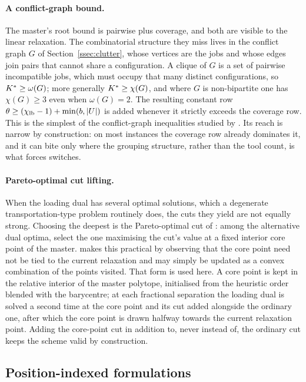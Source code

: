 \paragraph{A conflict-graph bound.}
The master's root bound is pairwise plus coverage, and both are visible to the linear
relaxation. The combinatorial structure they miss lives in the conflict graph $G$ of
Section~\ref{ssec:clutter}, whose vertices are the jobs and whose edges join pairs
that cannot share a configuration. A clique of $G$ is a set of pairwise incompatible
jobs, which must occupy that many distinct configurations, so $K^{\ast}\ge\omega(G)$; more
generally $K^{\ast}\ge\chi(G)$, and where $G$ is non-bipartite one has $\chi(G)\ge3$ even
when $\omega(G)=2$. The resulting constant row
$\theta\ge(\chi_{\mathrm{lb}}-1)+\min(b,\lvert U\rvert)$ is added whenever it strictly
exceeds the coverage row. This is the simplest of the conflict-graph inequalities studied by
\citet{Atamturk2000}. Its reach is narrow by construction: on most instances the
coverage row already dominates it, and it can bite only where the grouping structure,
rather than the tool count, is what forces switches.

\paragraph{Pareto-optimal cut lifting.}
When the loading dual has several optimal solutions, which a degenerate
transportation-type problem routinely does, the cuts they yield are not equally
strong. Choosing the deepest is the Pareto-optimal cut of \citet{MagnantiWong1981}:
among the alternative dual optima, select the one maximising the cut's value at a fixed
interior core point of the master. \citet{Papadakos2008} makes this practical by
observing that the core point need not be tied to the current relaxation and may simply
be updated as a convex combination of the points visited. That form is used here. A
core point is kept in the relative interior of the master polytope, initialised from
the heuristic order blended with the barycentre; at each fractional separation the
loading dual is solved a second time at the core point and its cut added alongside the
ordinary one, after which the core point is drawn halfway towards the current
relaxation point. Adding the core-point cut in addition to, never instead of, the
ordinary cut keeps the scheme valid by construction.

\subsection{Position-indexed formulations}\label{ssec:pos}

